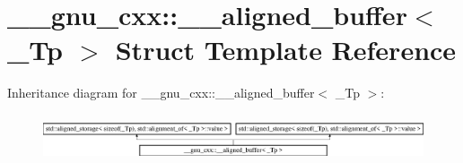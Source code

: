 \hypertarget{struct____gnu__cxx_1_1____aligned__buffer}{\section{\+\_\+\+\_\+gnu\+\_\+cxx\+:\+:\+\_\+\+\_\+aligned\+\_\+buffer$<$ \+\_\+\+Tp $>$ Struct Template Reference}
\label{struct____gnu__cxx_1_1____aligned__buffer}
}
Inheritance diagram for \+\_\+\+\_\+gnu\+\_\+cxx\+:\+:\+\_\+\+\_\+aligned\+\_\+buffer$<$ \+\_\+\+Tp $>$\+:\begin{figure}[H]
\begin{center}
\leavevmode
\includegraphics[height=1.393035cm]{struct____gnu__cxx_1_1____aligned__buffer}
\end{center}
\end{figure}
